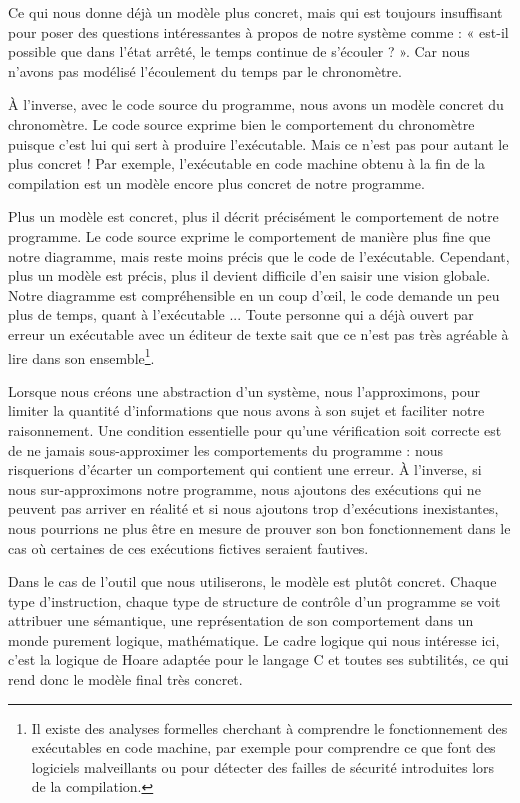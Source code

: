 Ce qui nous donne déjà un modèle plus concret, mais qui est toujours insuffisant
pour poser des questions intéressantes à propos de notre système comme : « est-il
possible que dans l'état arrêté, le temps continue de s'écouler ? ». Car nous
n'avons pas modélisé l'écoulement du temps par le chronomètre.



À l'inverse, avec le code source du programme, nous avons un modèle concret du
chronomètre. Le code source exprime bien le comportement du chronomètre puisque
c'est lui qui sert à produire l'exécutable. Mais ce n'est pas pour autant le
plus concret ! Par exemple, l'exécutable en code machine obtenu à la fin
de la compilation est un modèle encore plus concret de notre programme.



Plus un modèle est concret, plus il décrit précisément le comportement de notre
programme. Le code source exprime le comportement de manière plus fine que notre
diagramme, mais reste moins précis que le code de l'exécutable. Cependant, plus
un modèle est précis, plus il devient difficile d'en saisir une vision globale.
Notre diagramme est compréhensible en un coup d'\oe{}il,
le code demande un peu plus de temps, quant à l'exécutable ... Toute personne qui
a déjà ouvert par erreur un exécutable avec un éditeur de texte sait que ce n'est
pas très agréable à lire dans son ensemble\footnote{Il existe des analyses
formelles cherchant à comprendre le fonctionnement des exécutables en code
machine, par exemple pour comprendre ce que font des logiciels malveillants ou
pour détecter des failles de sécurité introduites lors de la compilation.}.



Lorsque nous créons une abstraction d'un système, nous l'approximons, pour limiter
la quantité d'informations que nous avons à son sujet et faciliter notre
raisonnement. Une condition essentielle pour qu'une vérification soit correcte
est de ne jamais sous-approximer les comportements du programme : nous risquerions
d'écarter un comportement qui contient une erreur.
À l'inverse, si nous sur-approximons notre programme, nous ajoutons des exécutions
qui ne peuvent pas arriver en réalité et si nous ajoutons trop d'exécutions
inexistantes, nous pourrions ne plus être en mesure de prouver son bon
fonctionnement dans le cas où certaines de ces exécutions fictives seraient fautives.



Dans le cas de l'outil que nous utiliserons, le modèle est plutôt concret.
Chaque type d'instruction, chaque type de structure de contrôle d'un programme
se voit attribuer une sémantique, une représentation de son comportement dans
un monde purement logique, mathématique. Le cadre logique qui nous intéresse
ici, c'est la logique de Hoare adaptée pour le langage C et toutes ses
subtilités, ce qui rend donc le modèle final très concret.


